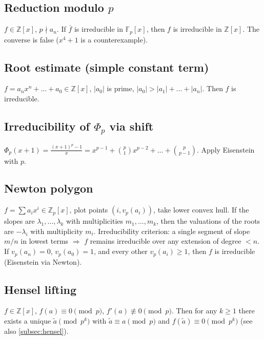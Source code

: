 \subsection{Reduction modulo $p$}
\label{subsec:reduction-mod-p}

$f\in\mathbb{Z}[x]$, $p\nmid a_n$. If $\bar f$ is irreducible in $\mathbb{F}_p[x]$, then $f$ is irreducible in $\mathbb{Z}[x]$. The converse is false ($x^4+1$ is a counterexample).

\subsection{Root estimate (simple constant term)}
\label{subsec:root-estimate-irred}

$f=a_nx^n+\dots+a_0\in\mathbb{Z}[x]$, $|a_0|$ is prime, $|a_0|>|a_1|+\dots+|a_n|$. Then $f$ is irreducible.

\subsection{Irreducibility of $\Phi_p$ via shift}
\label{subsec:phi-p-eisenstein}

$\Phi_p(x+1)=\frac{(x+1)^p-1}{x}=x^{p-1}+\binom{p}{1}x^{p-2}+\dots+\binom{p}{p-1}$. Apply Eisenstein with $p$.

\subsection{Newton polygon}
\label{subsec:newton-polygon}

$f=\sum a_i x^i\in\mathbb{Z}_p[x]$, plot points $(i,v_p(a_i))$, take lower convex hull. If the slopes are $\lambda_1,\dots,\lambda_k$ with multiplicities $m_1,\dots,m_k$, then the valuations of the roots are $-\lambda_i$ with multiplicity $m_i$. Irreducibility criterion: a single segment of slope $m/n$ in lowest terms $\Rightarrow$ $f$ remains irreducible over any extension of degree $<n$. If $v_p(a_n)=0$, $v_p(a_0)=1$, and every other $v_p(a_i)\ge1$, then $f$ is irreducible (Eisenstein via Newton).

\subsection{Hensel lifting}
\label{subsec:hensel-polynomial}

$f\in\mathbb{Z}[x]$, $f(a)\equiv0\pmod p$, $f'(a)\not\equiv0\pmod p$. Then for any $k\ge1$ there exists a unique $\tilde a\pmod{p^k}$ with $\tilde a\equiv a\pmod p$ and $f(\tilde a)\equiv0\pmod{p^k}$ (see also \ref{subsec:hensel}).
